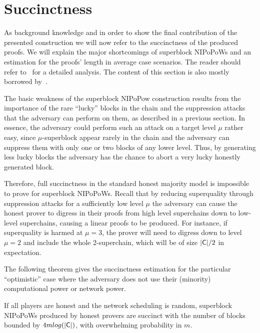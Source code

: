\section{Succinctness}
 As background knowledge and in order to show the final contribution of the presented construction we will now refer to the succinctness of the produced proofs. We will explain the major shortcomings of superblock NIPoPoWs and an estimation for the proofs' length in average case scenarios. The reader should refer to~\cite{nipopows} for a detailed analysis. The content of this section is also mostly borrowed by~\cite{nipopows}.
 
 The basic weakness of the superblock NIPoPow construction results from the importance of the rare ``lucky'' blocks in the chain and the suppression attacks that the adversary can perform on them, as described in a previous section. In essence, the adversary could perform such an attack on a target level $\mu$ rather easy, since $\mu$-superblock appear rarely in the chain and the adversary can suppress them with only one or two blocks of any lower level. Thus, by generating less lucky blocks the adversary has the chance to abort a very lucky honestly generated block.

 Therefore, full succinctness in the standard honest majority model is impossible to prove for superblock NIPoPoWs. Recall that by reducing superquality through suppression attacks for a sufficiently low level $\mu$ the adversary can cause the honest prover to digress in their proofs from high level superchains down to low-level superchains, causing a linear proofs to be produced. For instance, if superquality is harmed at $\mu = 3$, the prover will need to digress down to level $\mu = 2$ and include the whole 2-superchain, which will be of size $\lvert \mathsf{C} \rvert /2$ in expectation.

 The following theorem gives the succinctness estimation for the particular ``optimistic'' case where the adversary does not use their (minority) computational power or network power.

 \begin{theorem}
     If all players are honest and the network scheduling is random, superblock NIPoPoWs produced by honest provers are succinct  with the number of blocks bounded by $4mlog(\lvert \mathsf{C} \rvert)$, with overwhelming probability in $m$.
\end{theorem}